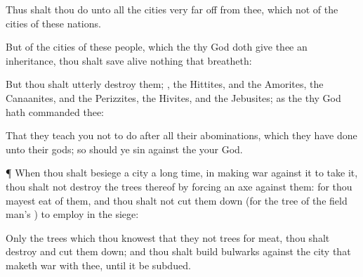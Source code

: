 {Thus shalt thou
do unto all the
cities
{}
very far
off from thee,
which
{} not of the
cities of these
nations.

But of the
cities of these
people, which the
{} thy
God doth
give thee
{} an
inheritance, thou shalt save
alive nothing that
breatheth:

But thou shalt
utterly
destroy them;
{}, the
Hittites, and the
Amorites, the
Canaanites, and the
Perizzites, the
Hivites, and the
Jebusites; as the
{} thy
God hath
commanded thee:

That they
teach you not to
do after all their
abominations, which they have
done unto their
gods; so should ye
sin against the
{} your
God.


\par }{\PP {}¶ When thou shalt
besiege a
city a
long
time, in making
war against it to
take it, thou shalt not
destroy the
trees thereof by
forcing an
axe against them: for thou mayest
eat of them, and thou shalt not cut them
down (for the
tree of the
field
{}
man’s
{}) to
employ
{} in the
siege:

Only the
trees which thou
knowest that they
{} not
trees for
meat, thou shalt
destroy and cut them
down; and thou shalt
build
bulwarks against the
city that
maketh
war with thee, until it be
subdued.




\par }
